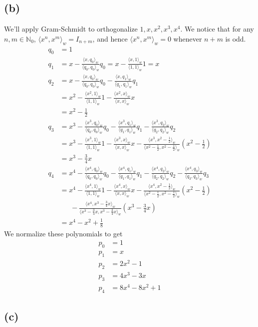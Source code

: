 \documentclass{article}
\newcommand{\inner}[2]{\langle #1, #2 \rangle_w}
\newcommand{\N}{\mathbb{N}}
\newcommand{\proj}[2]{\frac{\inner{#1}{#2}}{\inner{#2}{#2}}#2}
\newcommand{\pproj}[2]{\frac{\inner{#1}{#2}}{\inner{#2}{#2}}\left(#2\right)}
\begin{document}
\subsection*{(b)}
We'll apply Gram-Schmidt to orthogonalize $1, x, x^2, x^3, x^4$.
We notice that for any $n, m \in \N_0$, $\inner{x^n}{x^m} = I_{n+m}$, and hence
$\inner{x^n}{x^m} = 0$ whenever $n + m$ is odd. 
\begin{align*}
	q_0 &= 1\\
	q_1 &= x - \proj{x}{q_0}
	= x - \proj{x}{1} = x\\
	q_2 &= x - \proj{x}{q_0} - \proj{x}{q_1}\\
	&= x^2 - \proj{x^2}{1} - \proj{x^2}{x}\\
	&= x^2 - \frac{1}{2}\\
	q_3 &= x^3 - \proj{x^3}{q_0} - \proj{x^3}{q_1} - \proj{x^3}{q_2}\\
	&= x^3 - \proj{x^3}{1} - \proj{x^3}{x} - \pproj{x^3}{x^2 - \frac{1}{2}}\\
	&= x^3 - \frac{3}{4}x\\
	q_4 &= x^4 - \proj{x^4}{q_0} - \proj{x^4}{q_1}
	- \proj{x^4}{q_2} - \proj{x^4}{q_3}\\
	&= x^4 - \proj{x^4}{1} - \proj{x^4}{x}
	- \pproj{x^4}{x^2 - \frac{1}{2}}\\
	&~~~~~~~- \pproj{x^4}{x^3 - \frac{3}{4}x}\\
	&= x^4 - x^2 + \frac{1}{8}
\end{align*}
We normalize these polynomials to get
\begin{align*}
	p_0 &= 1\\
	p_1 &= x\\
	p_2 &= 2x^2 - 1\\
	p_3 &= 4x^3 - 3x\\
	p_4 &= 8x^4 - 8x^2 + 1
\end{align*}

\subsection*{(c)}
\end{document}
